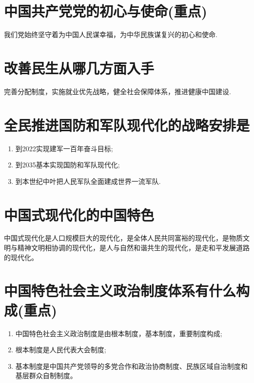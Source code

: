 \documentclass[12pt, a4paper, oneside]{ctexbook}
\begin{document}
\section{中国共产党党的初心与使命(重点)}

我们党始终坚守着为中国人民谋幸福，为中华民族谋复兴的初心和使命.

\section{改善民生从哪几方面入手}

完善分配制度，实施就业优先战略，健全社会保障体系，推进健康中国建设.

\section{全民推进国防和军队现代化的战略安排是}

\begin{enumerate}
\item 到2022实现建军一百年奋斗目标;

\item 到2035基本实现国防和军队现代化;

\item 到本世纪中叶把人民军队全面建成世界一流军队.
\end{enumerate}

\section{中国式现代化的中国特色}

中国式现代化是人口规模巨大的现代化，是全体人民共同富裕的现代化，是物质文明与精神文明相协调的现代化，是人与自然和谐共生的现代化，是走和平发展道路的现代化。

\section{中国特色社会主义政治制度体系有什么构成(重点)}
\begin{enumerate}
\item 中国特色社会主义政治制度是由根本制度，基本制度，重要制度构成;

\item 根本制度是人民代表大会制度;

\item 基本制度是中国共产党领导的多党合作和政治协商制度、民族区域自治制度和基层群众自制制度。
\end{enumerate}
\end{document}
